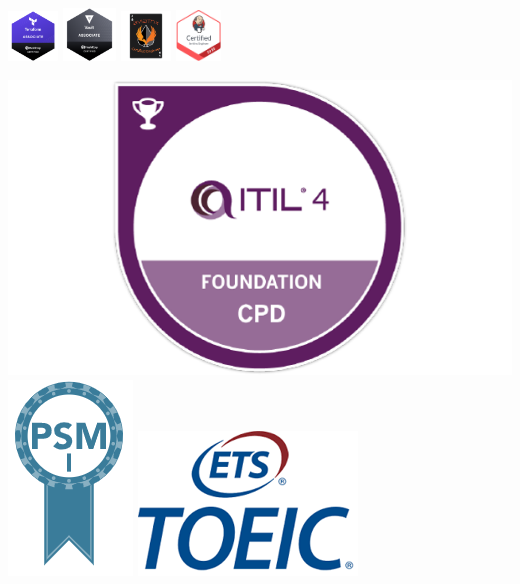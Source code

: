\documentclass[10pt,a4paper,normalphoto]{altacv}
\begin{document}
\begin{paracol}{2}
\includegraphics[width=0.1\textwidth]{Terraform-Associate-Badge.png}
\includegraphics[width=0.105\textwidth]{vault}
\includegraphics[width=0.1\textwidth]{aceAssociatetBadgeArtboard_1.png}
\includegraphics[width=0.09\textwidth]{jenkins}


\divider

\includegraphics[width=0.16 \textwidth]{itil} \includegraphics[width=0.06 \textwidth]{psm}
\hspace{5mm}\includegraphics[width=0.12 \textwidth]{toeic}

\divider\\

\newpage


 \\

\divider\smallskip\\

\\

\divider\smallskip\\


\end{paracol}
\end{document}
